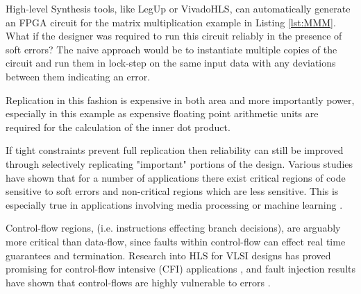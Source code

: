\providecommand*{\lstnumberautorefname}{line}

High-level Synthesis tools, like LegUp or VivadoHLS, can automatically generate an FPGA 
circuit for the matrix multiplication example in Listing \ref{lst:MMM}.
What if the designer was required to run this circuit reliably in the
presence of soft errors? 
The naive approach would be to instantiate multiple copies of the circuit and run
them in lock-step on the same input data with any deviations between them
indicating an error.



Replication in this fashion is expensive in both area and more importantly
power, especially in this example as expensive floating point arithmetic
units are required for the calculation of the inner dot product.

If tight constraints prevent full replication then reliability can still be
improved through selectively replicating "important" portions of the design.
Various studies have shown that for a number of applications there exist critical regions
of code sensitive to soft errors and non-critical regions which are less sensitive.
This is especially true in applications involving media processing or machine
learning\cite{wong2006soft} \cite{liu2012flikker}.

Control-flow regions, (i.e. instructions effecting branch decisions), are arguably more critical
than data-flow, since faults within control-flow can effect real time guarantees
and termination.
Research into HLS for VLSI designs has proved promising for control-flow intensive
(CFI) applications \cite{chen2014reliability,chen2015reliability}, and fault injection
results have shown that control-flows are highly vulnerable to errors
\cite{saggese2005microprocessor, nakka2007processor, wong2006soft}.

